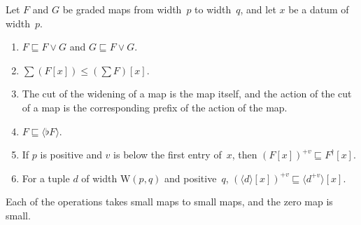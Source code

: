 \documentclass[11pt]{amsart}
\makeatletter
\newcommand{\W}{\mathrm{W}}
\newcommand{\tsum}[1]{\textstyle\sum #1}
\newcommand{\tle}{\mathrel{\sqsubseteq}}      %
\newcommand{\act}[2]{#1[#2]}                  %
\newcommand{\rd}[1]{\langle #1 \rangle}       %
\newif\ifagdarefs
\newcommand{\AgdaRefs}[1]{\ifagdarefs{\footnotesize\color{agdablue}(#1)}\else\unskip\fi}
\newcommand{\Agda}[2]{{\footnotesize\color{agdablue}\textsf{#1}%
  \ifblank{#2}{}{\texttt{.}\allowbreak\texttt{#2}}}}
\let\ttt@plain\texttt
\renewcommand{\texttt}[1]{{\footnotesize\color{agdablue}\ttt@plain{#1}}}
\theoremstyle{plain}
\theoremstyle{definition}
\makeatother
\begin{document}
\begin{lemma}
\label{lem:rect-ops}
Let $F$ and $G$ be graded maps from width~$p$ to width~$q$, and let
$x$ be a datum of width~$p$.
\begin{enumerate}
\item\label{item:rjoin}
  $F \tle F \vee G$ and $G \tle F \vee G$.
\item\label{item:rsum}
  $\tsum(\act F x) \le \act{(\tsum F)}{x}$.
\item\label{item:rcut}
  The cut of the widening of a map is the map itself, and the action
  of the cut of a map is the corresponding prefix of the action of the
  map.
\item\label{item:rflat}
  $F \tle \rd{\flat F}$.
\item\label{item:rtrans}
  If $p$ is positive and $v$ is below the first entry of~$x$, then
  $(\act F x)^{+v} \tle \act{F^{\dagger}}{x}$.
\item\label{item:rread}
  For a tuple $d$ of width $\W(p,q)$ and positive~$q$,
  $(\act{\rd d}{x})^{+v} \tle \act{\rd{d^{+v}}}{x}$.
\end{enumerate}
Each of the operations takes small maps to small maps, and the zero
map is small.
\AgdaRefs{\Agda{BrouwerOrdinals.RectAlgebra}{joinRD-left};
\texttt{joinRD-right}, \texttt{rect-padRD}, \texttt{flatRD-⊒},
\texttt{rect-addνc}, \texttt{zeroRD-All<}, \texttt{joinRD-All<},
\texttt{padRD-All<}, \texttt{flatRD-All<}, \texttt{addRDc-All<};
\Agda{BrouwerOrdinals.RectSum}{tsum-rect}, \texttt{sumRD-All<};
\Agda{BrouwerOrdinals.RectApply}{rect-preRD}, \texttt{preRD-All<};
\Agda{BrouwerOrdinals.RectAdd}{rect-sucRD}, \texttt{rect-addν}.}
\end{lemma}
\end{document}
